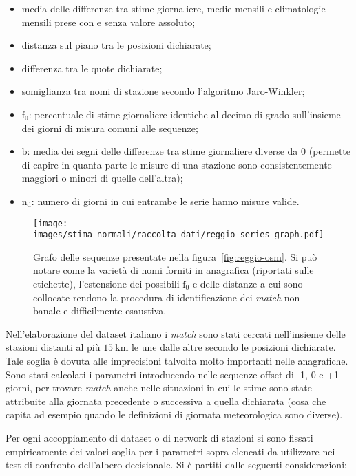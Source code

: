 \begin{itemize}
  \item
    media delle differenze tra stime giornaliere, medie mensili e climatologie mensili prese con e senza valore assoluto;
  \item
    distanza sul piano tra le posizioni dichiarate;
  \item
    differenza tra le quote dichiarate;
  \item
    somiglianza tra nomi di stazione secondo l'algoritmo Jaro-Winkler;
  \item
    \(\mathrm{f}_0\): percentuale di stime giornaliere identiche al decimo di grado sull'insieme dei giorni di misura comuni alle sequenze;
  \item
    \(\mathrm{b}\): media dei segni delle differenze tra stime giornaliere diverse da 0 (permette di capire in quanta parte le misure di una stazione sono consistentemente maggiori o minori di quelle dell'altra);
  \item
    \(\mathrm{n_d}\): numero di giorni in cui entrambe le serie hanno misure valide.
\end{itemize}

\begin{figure}[ht]
  \centering
  \texttt{[image: images/stima\_normali/raccolta\_dati/reggio\_series\_graph.pdf]}
  \caption{Grafo delle sequenze presentate nella figura~\ref{fig:reggio-osm}. Si può notare come la varietà di nomi forniti in anagrafica (riportati sulle etichette), l'estensione dei possibili \(\mathrm{f}_0\) e delle distanze a cui sono collocate rendono la procedura di identificazione dei \emph{match} non banale e difficilmente esaustiva.}\label{fig:reggio-graph}
\end{figure}

Nell'elaborazione del dataset italiano i \emph{match} sono stati cercati nell'insieme delle stazioni distanti al più \(15\:\mathrm{km}\) le une dalle altre secondo le posizioni dichiarate. Tale soglia è dovuta alle imprecisioni talvolta molto importanti nelle anagrafiche. Sono stati calcolati i parametri introducendo nelle sequenze offset di -1, 0 e +1 giorni, per trovare \emph{match} anche nelle situazioni in cui le stime sono state attribuite alla giornata precedente o successiva a quella dichiarata (cosa che capita ad esempio quando le definizioni di giornata meteorologica sono diverse).

Per ogni accoppiamento di dataset o di network di stazioni si sono fissati empiricamente dei valori-soglia per i parametri sopra elencati da utilizzare nei test di confronto dell'albero decisionale. Si è partiti dalle seguenti considerazioni:

